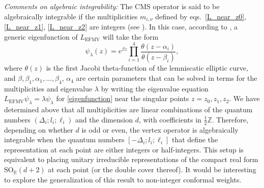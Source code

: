 \documentclass{article}
\def \Dg {\Delta}
\def \ag {\alpha}
\def \bg {\beta}
\def \la {\lambda}
\def \Zs {\mathbb{Z}}
\def \Rs {\mathbb{R}}
\begin{document}
\textit{Comments on algebraic integrability:} The CMS operator is said to be algebraically integrable if the multiplicities $m_{i,\nu}$ defined by eqs.\ \eqref{L_near_z0}, \eqref{L_near_z1}, \eqref{L_near_z2} are integers (see \cite[Corollary~2.4]{etingof2011algebraically}). In this case, according to \cite[Theorem~2.5]{etingof2011algebraically}, a generic eigenfunction of $L_{\mathrm{EFMV}}$ will take the form
\begin{equation}
    \psi_{\la}(z) = e^{\bg z} \prod_{i=1}^4 \frac{\theta(z-\ag_i)}{\theta(z-\bg_i)},
    \label{eigenfunction}
\end{equation}
where $\theta(z)$ is the first Jacobi theta-function of the lemniscatic elliptic curve, and
$\bg,\bg_1,\ag_1,\dots,\bg_4$, $\ag_4$ are certain parameters that can be solved in terms for the multiplicities and eigenvalue $\lambda$ by writing the eigenvalue equation $L_{\mathrm{EFMV}} \psi_{\lambda} = \la \psi_{\lambda}$ for \eqref{eigenfunction} near the singular points $z=z_0,z_1,z_2$. We have determined above that all multiplicities are linear combinations 
of the quantum numbers $(\Dg_i;l_i;\ell_i)$ and the dimension $d$, with coefficients in
$\frac{1}{2}\Zs$. Therefore, depending on whether $d$ is odd or even, the vertex operator is algebraically integrable when the quantum numbers $[-\Dg_i;l_i;\ell_i]$ that define the 
representation at each point are either integers or half-integers. This setup is equivalent to placing unitary irreducible representations of the compact real form $\mathrm{SO}_{\Rs}(d+2)$ at 
each point (or the double cover thereof). It would be interesting to explore the generalization of this result to non-integer conformal weights. 
\smallskip 
\end{document}
